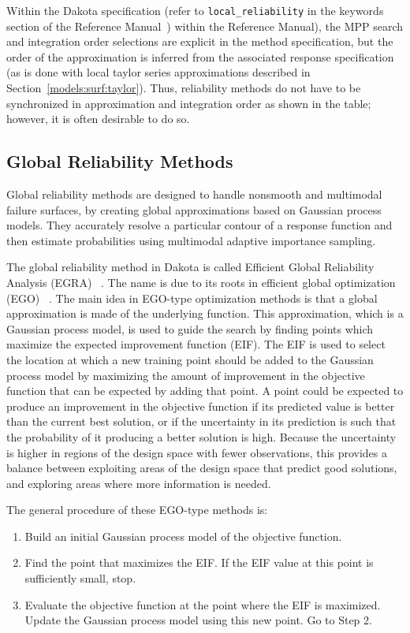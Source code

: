Within the Dakota specification (refer to \texttt{local\_reliability}
in the keywords section of the Reference Manual~\cite{RefMan})
within the Reference Manual), the MPP search and integration order
selections are explicit in the method specification, but the order of
the approximation is inferred from the associated response
specification (as is done with local taylor series approximations
described in Section~\ref{models:surf:taylor}). Thus, reliability
methods do not have to be synchronized in approximation and
integration order as shown in the table; however, it is often
desirable to do so.


\subsection{Global Reliability Methods}\label{uq:reliability:global}

Global reliability methods are designed to handle nonsmooth and
multimodal failure surfaces, by creating global approximations based
on Gaussian process models. They accurately resolve a particular
contour of a response function and then estimate probabilities using
multimodal adaptive importance sampling.

The global reliability method in Dakota is called 
Efficient Global Reliability Analysis (EGRA) ~\cite{Bichon2008}. 
The name is due to its 
roots in efficient global optimization (EGO) ~\cite{Jon98,Hua06}.
The main idea in EGO-type optimization methods is that a global 
approximation is made of the underlying function. This approximation, 
which is a Gaussian process model, is used to guide the search by finding 
points which maximize the expected improvement function (EIF). 
The EIF is used to select the location at which a new training point should be
added to the Gaussian process model by maximizing the amount of improvement 
in the objective function that can be expected by adding that point.
A point could be expected to produce an improvement in the objective function 
if its predicted value is better than the current best solution, or if the 
uncertainty in its prediction is such that the probability of it producing
a better solution is high.
Because the uncertainty is higher in regions of the design space with fewer
observations, this provides a balance between exploiting areas of the
design space that predict good solutions, and exploring areas where more
information is needed.

The general procedure of these EGO-type methods is:
\begin{enumerate}
\item Build an initial Gaussian process model of the objective function.
\item Find the point that maximizes the EIF.
      If the EIF value at this point is sufficiently small, stop.
\item Evaluate the objective function at the point where the EIF is maximized.
      Update the Gaussian process model using this new point.
      Go to Step 2.
\end{enumerate}

